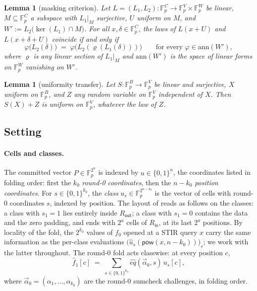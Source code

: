 \documentclass{article}
\newcommand{\Fp}{\mathbb{F}_p}
\newcommand{\pow}{\mathsf{pow}}
\newtheorem{lemma}[theorem]{Lemma}
\theoremstyle{definition}
\begin{document}
\begin{lemma}[masking criterion]\label{lem:mask}
Let $L = (L_1, L_2) : \Fp^C \to \Fp^V \times \Fp^W$ be linear, $M \subseteq \Fp^C$ a subspace with $L_1|_M$ surjective, $U$ uniform on $M$, and $W' := L_2\big(\ker(L_1) \cap M\big)$. For all $x, \delta \in \Fp^C$, the laws of $L(x + U)$ and $L(x + \delta + U)$ coincide if and only if
\[
\varphi\big(L_2(\delta)\big) \;=\; \varphi\big(L_2(\varrho(L_1(\delta)))\big) \qquad \text{for every } \varphi \in \mathrm{ann}(W') ,
\]
where $\varrho$ is any linear section of $L_1|_M$ and $\mathrm{ann}(W')$ is the space of linear forms on $\Fp^W$ vanishing on $W'$.
\end{lemma}

\begin{lemma}[uniformity transfer]\label{lem:transfer}
Let $S : \Fp^B \to \Fp^V$ be linear and surjective, $X$ uniform on $\Fp^B$, and $Z$ any random variable on $\Fp^V$ independent of $X$. Then $S(X) + Z$ is uniform on $\Fp^V$, whatever the law of $Z$.
\end{lemma}

\subsection{Setting}\label{sec:setting}

\paragraph{Cells and classes.} The committed vector $P \in \Fp^{2^n}$ is indexed by $u \in \{0,1\}^n$, the coordinates listed in folding order: first the $k_0$ \emph{round-0 coordinates}, then the $n - k_0$ \emph{position coordinates}. For $s \in \{0,1\}^{k_0}$, the \emph{class} $u_s \in \Fp^{2^{n - k_0}}$ is the vector of cells with round-0 coordinates $s$, indexed by position. The layout of  reads as follows on the classes: a class with $s_1 = 1$ lies entirely inside $R_{\mathsf{out}}$; a class with $s_1 = 0$ contains the data and the zero padding, and ends with $2^a$ cells of $R_{\mathsf{in}}$, at its last $2^a$ positions. By locality of the fold, the $2^{k_0}$ values of $f_0$ opened at a STIR query $x$ carry the same information as the per-class evaluations $\big(\hat{u}_s(\pow(x, n - k_0))\big)_s$; we work with the latter throughout. The round-0 fold acts classwise: at every position $c$,
\[
\hat{f}_1[c] \;=\; \sum_{s \in \{0,1\}^{k_0}} \hat{eq}(\vec{\alpha}_0, s)\, u_s[c] ,
\]
where $\vec{\alpha}_0 = (\alpha_1, \dots, \alpha_{k_0})$ are the round-0 sumcheck challenges, in folding order.
\end{document}
